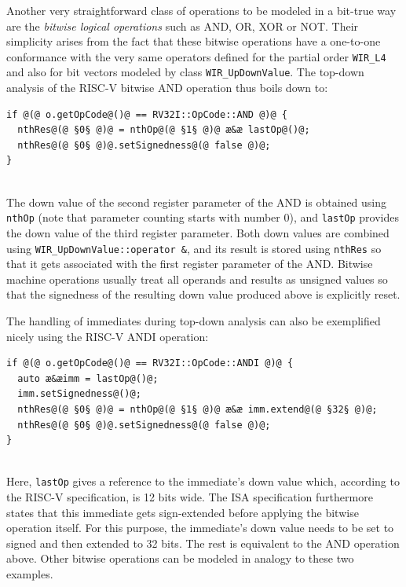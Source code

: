 \begin{enumerate}[resume]
  Another very straightforward class of operations to be modeled in a bit-true way are the \emph{bitwise logical operations} such as AND, OR, XOR or NOT.
  Their simplicity arises from the fact that these bitwise operations have a one-to-one conformance with the very same operators defined for the partial order \texttt{WIR\_L4} and also for bit vectors modeled by class \texttt{WIR\_UpDownValue}.
  The top-down analysis of the RISC-V bitwise AND operation thus boils down to: \\
\begin{lstlisting}[style=code,float=!h,xleftmargin=10mm,aboveskip=-0.8 \baselineskip,belowskip=-0.8 \baselineskip]
if @(@ o.getOpCode@()@ == RV32I::OpCode::AND @)@ {
  nthRes@(@ §0§ @)@ = nthOp@(@ §1§ @)@ æ&æ lastOp@()@;
  nthRes@(@ §0§ @)@.setSignedness@(@ false @)@;
}
\end{lstlisting}
  \\
  The down value of the second register parameter of the AND is obtained using \texttt{nthOp} (note that parameter counting starts with number 0), and \texttt{lastOp} provides the down value of the third register parameter.
  Both down values are combined using \texttt{WIR\_UpDownValue::operator \&}, and its result is stored using \texttt{nthRes} so that it gets associated with the first register parameter of the AND.
  Bitwise machine operations usually treat all operands and results as unsigned values so that the signedness of the resulting down value produced above is explicitly reset.

  The handling of immediates during top-down analysis can also be exemplified nicely using the RISC-V ANDI operation: \\
\begin{lstlisting}[style=code,float=!h,xleftmargin=10mm,aboveskip=-0.8 \baselineskip,belowskip=-0.8 \baselineskip]
if @(@ o.getOpCode@()@ == RV32I::OpCode::ANDI @)@ {
  auto æ&æimm = lastOp@()@;
  imm.setSignedness@()@;
  nthRes@(@ §0§ @)@ = nthOp@(@ §1§ @)@ æ&æ imm.extend@(@ §32§ @)@;
  nthRes@(@ §0§ @)@.setSignedness@(@ false @)@;
}
\end{lstlisting}
  \\
  Here, \texttt{lastOp} gives a reference to the immediate's down value which, according to the RISC-V specification, is 12 bits wide.
  The \gls{ISA} specification furthermore states that this immediate gets sign-extended before applying the bitwise operation itself.
  For this purpose, the immediate's down value needs to be set to signed and then extended to 32 bits.
  The rest is equivalent to the AND operation above.
  Other bitwise operations can be modeled in analogy to these two examples.


\end{enumerate}
